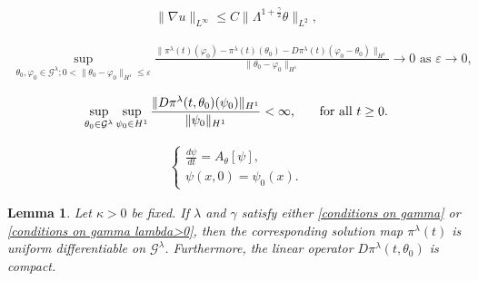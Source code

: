 \documentclass[10pt,a4paper]{amsart}
\newtheorem{lemma}{Lemma}
\newcommand{\Gg}{\mathcal{G}^{\lambda}}
\newcommand{\dis}{\displaystyle}
\newcommand{\pin}{\pi^{\lambda}}
\begin{document}
\begin{align}\label{bound on nabla u in terms of nabla theta}
\|\nabla u\|_{L^\infty}\le C\|\Lambda^{1+\frac{\gamma}{2}}\theta\|_{L^2},
\end{align}

\begin{align}\label{condition 1 for uniform differentiable}
\mbox{$\dis\sup_{\theta_0,\varphi_0\in\Gg;0<\|\theta_0-\varphi_0\|_{H^1}\le\varepsilon}\frac{\|\pin(t)(\varphi_0)-\pin(t)(\theta_0)-D\pin(t)(\varphi_0-\theta_0)\|_{H^1}}{\|\theta_0-\varphi_0\|_{H^1}}\to0$ as $\varepsilon\to0$,}
\end{align}

\begin{align}\label{condition 2 for uniform differentiable}
\mbox{$\dis\sup_{\theta_0\in\Gg}\sup_{\psi_0\in H^1}\frac{\|D\pin(t,\theta_0)(\psi_0)\|_{H^1}}{\|\psi_0\|_{H^1}}<\infty$,\qquad for all $t\ge0$.}
\end{align}

\begin{align}\label{linearised active scalar with gamma}
\left\{ \begin{array}{l}
\frac{d\psi}{dt}=A_{\theta}[\psi], \\
\psi(x,0)=\psi_0(x).
\end{array}\right.
\end{align}

\begin{lemma}\label{uniform differentiable lemma}
Let $\kappa>0$ be fixed. If $\lambda$ and $\gamma$ satisfy either \eqref{conditions on gamma} or \eqref{conditions on gamma lambda>0}, then the corresponding solution map $\pin(t)$ is uniform differentiable on $\Gg$. Furthermore, the linear operator $D\pin(t, \theta_0)$ is compact.
\end{lemma}
\end{document}

